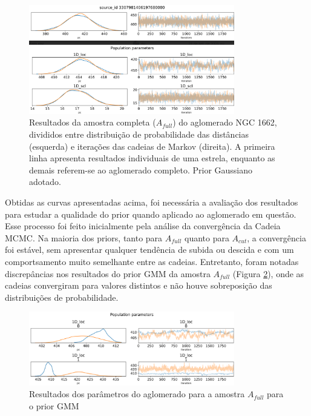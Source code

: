 \documentclass[12pt]{projeto}
\begin{document}
\begin{figure}[ht]
\centering
\includegraphics[width= 0.8\textwidth]{gaussian_ngc1662.png}
\caption{\label{fig:ex_gaussiano} Resultados da amostra completa ($A_{full}$) do aglomerado NGC 1662, divididos entre distribuição de probabilidade das distâncias (esquerda) e iterações das cadeias de Markov (direita). A primeira linha apresenta resultados individuais de uma estrela, enquanto as demais referem-se ao aglomerado completo. Prior Gaussiano adotado.}
\end{figure}

Obtidas as curvas apresentadas acima, foi necessária a avaliação dos resultados para estudar a qualidade do prior quando aplicado ao aglomerado em questão. Esse processo foi feito inicialmente pela análise da convergência da Cadeia MCMC. Na maioria dos priors, tanto para \(A_{full}\) quanto para \(A_{cut}\), a convergência foi estável, sem apresentar qualquer tendência de subida ou descida e com um comportsamento muito semelhante entre as cadeias. Entretanto, foram notadas discrepâncias nos resultados do prior GMM da amostra \(A_{full}\) (Figura \ref{fig:gmm_ngc1662full}), onde as cadeias convergiram para valores distintos e não houve sobreposição das distribuições de probabilidade.

\begin{figure}[ht]
\centering
\includegraphics[width= 0.8\textwidth]{gmm_ngc1662full.png}
\caption{\label{fig:gmm_ngc1662full} Resultados dos parâmetros do aglomerado para a amostra \(A_{full}\) para o prior GMM}
\end{figure}
\end{document}

